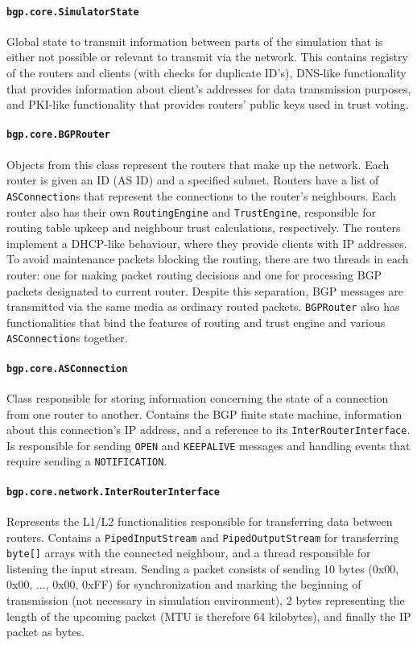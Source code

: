 \documentclass[11pt,a4paper,titlepage]{report}
\begin{document}
\paragraph{\texttt{bgp.core.SimulatorState}}
Global state to transmit information between parts of the simulation that is either not possible or relevant to transmit via the network. This contains registry of the routers and clients (with checks for duplicate ID's), DNS-like functionality that provides information about client's addresses for data transmission purposes, and PKI-like functionality that provides routers' public keys used in trust voting.

\paragraph{\texttt{bgp.core.BGPRouter}}
Objects from this class represent the routers that make up the network. Each router is given an ID (AS ID) and a specified subnet. Routers have a list of \texttt{ASConnection}s that represent the connections to the router's neighbours. Each router also has their own \texttt{RoutingEngine} and \texttt{TrustEngine}, responsible for routing table upkeep and neighbour trust calculations, respectively. The routers implement a DHCP-like behaviour, where they provide clients with IP addresses. To avoid maintenance packets blocking the routing, there are two threads in each router: one for making packet routing decisions and one for processing BGP packets designated to current router. Despite this separation, BGP messages are transmitted via the same media as ordinary routed packets. \texttt{BGPRouter} also has functionalities that bind the features of routing and trust engine and various \texttt{ASConnection}s together.

\paragraph{\texttt{bgp.core.ASConnection}}
Class responsible for storing information concerning the state of a connection from one router to another. Contains the BGP finite state machine, information about this connection's IP address, and a reference to its \texttt{InterRouterInterface}. Is responsible for sending \texttt{OPEN} and \texttt{KEEPALIVE} messages and handling events that require sending a \texttt{NOTIFICATION}.

\paragraph{\texttt{bgp.core.network.InterRouterInterface}}
Represents the L1/L2 functionalities responsible for transferring data between routers. Contains a \texttt{PipedInputStream} and \texttt{PipedOutputStream} for transferring \texttt{byte[]} arrays with the connected neighbour, and a thread responsible for listening the input stream. Sending a packet consists of sending 10 bytes (0x00, 0x00, ..., 0x00, 0xFF) for synchronization and marking the beginning of transmission (not necessary in simulation environment), 2 bytes representing the length of the upcoming packet (MTU is therefore 64 kilobytes), and finally the IP packet as bytes.
\end{document}
